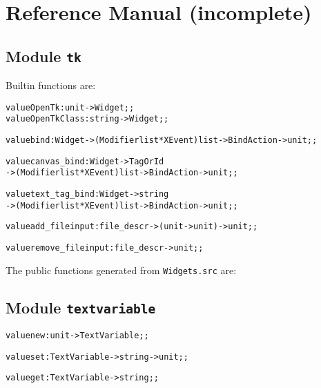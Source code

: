 \chapter{Reference Manual (incomplete)}
\label{chap:ref}
\section*{Module {\tt tk}}
Builtin functions are:
\begin{alltt}
value OpenTk : unit -> Widget;;
value OpenTkClass : string -> Widget;;

value bind : Widget -> (Modifier list * XEvent) list -> BindAction -> unit;;

value canvas_bind : Widget -> TagOrId 
     -> (Modifier list * XEvent) list -> BindAction -> unit;;

value text_tag_bind : Widget -> string 
     -> (Modifier list * XEvent) list -> BindAction -> unit;;

value add_fileinput : file_descr -> (unit -> unit) -> unit;;

value remove_fileinput : file_descr -> unit;;
\end{alltt}

\noindent
The public functions generated from {\tt Widgets.src} are:
\begin{alltt}

\end{alltt}



\section*{Module {\tt textvariable}}
\begin{alltt}
value new : unit -> TextVariable;;

value set : TextVariable -> string -> unit;;

value get : TextVariable -> string;;
\end{alltt}
